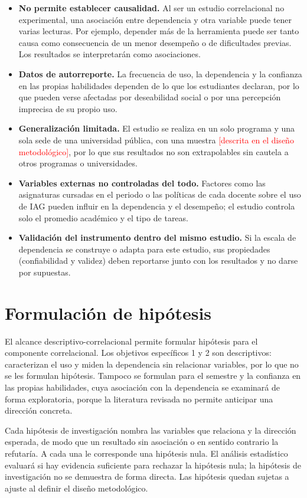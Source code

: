 \documentclass[12pt,letterpaper]{article}
\newcommand{\pendiente}[1]{\textcolor{red}{[#1]}}
\begin{document}
\begin{itemize}
  \item \textbf{No permite establecer causalidad.} Al ser un estudio correlacional no experimental, una asociación entre dependencia y otra variable puede tener varias lecturas. Por ejemplo, depender más de la herramienta puede ser tanto causa como consecuencia de un menor desempeño o de dificultades previas. Los resultados se interpretarán como asociaciones.
  \item \textbf{Datos de autorreporte.} La frecuencia de uso, la dependencia y la confianza en las propias habilidades dependen de lo que los estudiantes declaran, por lo que pueden verse afectadas por deseabilidad social o por una percepción imprecisa de su propio uso.
  \item \textbf{Generalización limitada.} El estudio se realiza en un solo programa y una sola sede de una universidad pública, con una muestra \pendiente{descrita en el diseño metodológico}, por lo que sus resultados no son extrapolables sin cautela a otros programas o universidades.
  \item \textbf{Variables externas no controladas del todo.} Factores como las asignaturas cursadas en el periodo o las políticas de cada docente sobre el uso de IAG pueden influir en la dependencia y el desempeño; el estudio controla solo el promedio académico y el tipo de tareas.
  \item \textbf{Validación del instrumento dentro del mismo estudio.} Si la escala de dependencia se construye o adapta para este estudio, sus propiedades (confiabilidad y validez) deben reportarse junto con los resultados y no darse por supuestas.
\end{itemize}

\section{Formulación de hipótesis}

El alcance descriptivo-correlacional permite formular hipótesis para el componente correlacional. Los objetivos específicos 1 y 2 son descriptivos: caracterizan el uso y miden la dependencia sin relacionar variables, por lo que no se les formulan hipótesis. Tampoco se formulan para el semestre y la confianza en las propias habilidades, cuya asociación con la dependencia se examinará de forma exploratoria, porque la literatura revisada no permite anticipar una dirección concreta.

Cada hipótesis de investigación nombra las variables que relaciona y la dirección esperada, de modo que un resultado sin asociación o en sentido contrario la refutaría. A cada una le corresponde una hipótesis nula. El análisis estadístico evaluará si hay evidencia suficiente para rechazar la hipótesis nula; la hipótesis de investigación no se demuestra de forma directa. Las hipótesis quedan sujetas a ajuste al definir el diseño metodológico.
\end{document}
